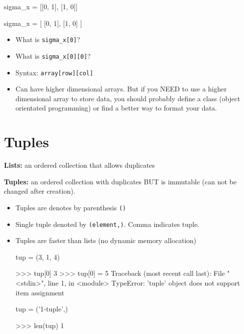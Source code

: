 \documentclass[12pt]{article}
\numberwithin{equation}{section}
\begin{document}
\begin{python}
sigma_x = [[0, 1], [1, 0]]

sigma_x = [ [0, 1], 
            [1, 0] ]
\end{python}

\begin{itemize}
    \item What is \verb|sigma_x[0]|?
    \item What is \verb|sigma_x[0][0]|?
    \item Syntax: \verb|array[row][col]|
    \item Can have higher dimensional arrays. But if you NEED to use a higher dimensional array to store data, you should probably define a class (object orientated programming) or find a better way to format your data.
\end{itemize}

\section{Tuples}
\textbf{Lists:} an ordered collection that allows duplicates

\textbf{Tuples:} an ordered collection with duplicates BUT is immutable (can not be changed after creation).
\begin{itemize}
    \item Tuples are denotes by parenthesis \verb|()|
    \item Single tuple denoted by \verb|(element,)|. Comma indicates tuple.
    \item Tuples are faster than lists (no dynamic memory allocation)
    \begin{python}
    tup = (3, 1, 4)
    
    >>> tup[0]
    3
    >>> tup[0] = 5
    Traceback (most recent call last):
    File "<stdin>", line 1, in <module>
    TypeError: 'tuple' object does not support item assignment
    
    tup = ('1-tuple',)
    
    >>> len(tup)
    1
    \end{python}
\end{itemize}
\end{document}
